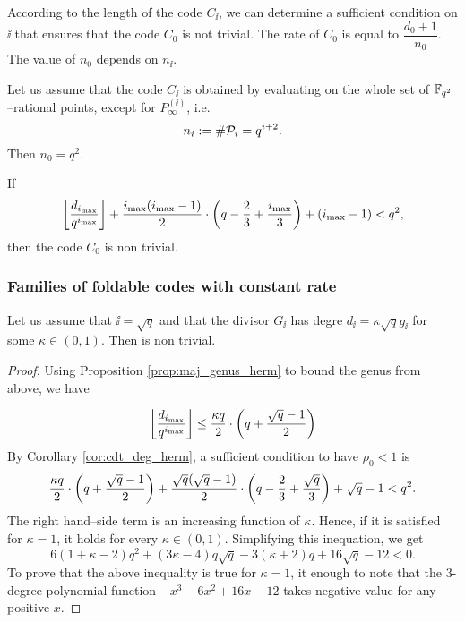 \documentclass[10pt]{article}
\begin{document}
According to the length of the code $C_{\ii}$, we can determine a sufficient condition on $\ii$ that ensures that the code $C_0$ is not trivial. The rate of $C_0$ is equal to $\dfrac{d_0+1}{n_0}$. The value of $n_0$ depends on $n_{\ii}$.

Let us assume that the code $C_{\ii}$ is obtained by evaluating on the whole set of $\mathbb{F}_{q^2}$--rational points, except for $P_\infty^{(\ii)}$, i.e. 
\[n_i := \#\mathcal{P}_i = q^{i+2}.\]
Then $n_0=q^2$. 

\begin{corollary}\label{cor:cdt_deg_herm}
If 
\[ \left\lfloor \dfrac{d_{i_{\rm{max}}}}{q^{i_{\rm{max}}}}\right\rfloor + \dfrac{i_{\rm{max}}(i_{\rm{max}}-1)}{2}\cdot \left(q-\frac{2}{3} + \frac{i_{\rm{max}}}{3}\right) + (i_{\rm{max}}-1) < q^2,\]
then the code $C_0$ is non trivial.
\end{corollary}

\subsubsection{Families of foldable codes with constant rate}


\begin{proposition}
	Let us assume that $\ii=\sqrt{q}$ and that the divisor $G_{\ii}$ has degre $d_{\ii} = \kappa \sqrt{q}g_{\ii}$ for some $\kappa \in (0,1)$.
	Then  is non trivial.
\end{proposition}
\begin{proof}
	Using Proposition \ref{prop:maj_genus_herm} to bound the genus from above, we have
	
	\[ \left\lfloor\dfrac{d_{i_{\rm{max}}}}{q^{i_{\rm{max}}}}\right\rfloor \leq  \dfrac{\kappa q}{2} \cdot \left( q + \dfrac{\sqrt{q}-1}{2} \right)\]
	By Corollary \ref{cor:cdt_deg_herm}, a sufficient condition to have $\rho_0 < 1$ is
	\[\dfrac{\kappa q}{2} \cdot \left( q + \dfrac{\sqrt{q}-1}{2} \right)+\dfrac{\sqrt{q}(\sqrt{q}-1)}{2}\cdot \left(q-\frac{2}{3} + \frac{\sqrt{q}}{3}\right) + \sqrt{q}-1 < q^2.\]
	The right hand--side term is an increasing function of $\kappa$. Hence, if it is satisfied for $\kappa=1$, it holds for every $\kappa \in (0,1)$. Simplifying this inequation, we get 
	\[6(1+\kappa - 2) q^2 + (3\kappa-4)q\sqrt{q}-3(\kappa+2)q+16\sqrt{q}-12 <0.\]
	To prove that the above inequality is true for $\kappa=1$, it enough to note that the 3-degree polynomial function $-x^3-6x^2+16x-12$ takes negative value for any positive $x$.
\end{proof}
\end{document}
